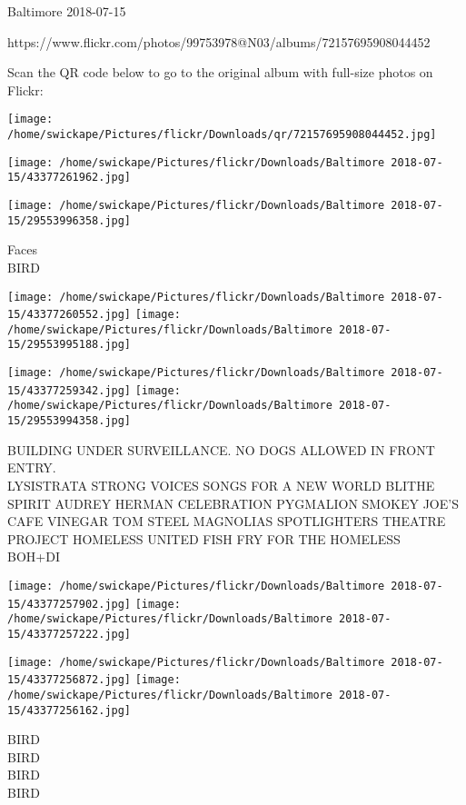 \documentclass[10pt,letterpaper]{article}
\begin{document}
Baltimore 2018-07-15

https://www.flickr.com/photos/99753978@N03/albums/72157695908044452

Scan the QR code below to go to the original album with full-size photos on Flickr:

\texttt{[image: /home/swickape/Pictures/flickr/Downloads/qr/72157695908044452.jpg]}
\pagebreak

\texttt{[image: /home/swickape/Pictures/flickr/Downloads/Baltimore 2018-07-15/43377261962.jpg]}

\vspace{0.25in}
\texttt{[image: /home/swickape/Pictures/flickr/Downloads/Baltimore 2018-07-15/29553996358.jpg]}

Faces\\
BIRD\\
\pagebreak

\texttt{[image: /home/swickape/Pictures/flickr/Downloads/Baltimore 2018-07-15/43377260552.jpg]}
\texttt{[image: /home/swickape/Pictures/flickr/Downloads/Baltimore 2018-07-15/29553995188.jpg]}

\texttt{[image: /home/swickape/Pictures/flickr/Downloads/Baltimore 2018-07-15/43377259342.jpg]}
\texttt{[image: /home/swickape/Pictures/flickr/Downloads/Baltimore 2018-07-15/29553994358.jpg]}

BUILDING UNDER SURVEILLANCE.  NO DOGS ALLOWED IN FRONT ENTRY.\\
LYSISTRATA STRONG VOICES SONGS FOR A NEW WORLD BLITHE SPIRIT AUDREY HERMAN CELEBRATION PYGMALION SMOKEY JOE'S CAFE VINEGAR TOM STEEL MAGNOLIAS SPOTLIGHTERS THEATRE\\
PROJECT HOMELESS UNITED FISH FRY FOR THE HOMELESS\\
BOH+DI\\
\pagebreak

\texttt{[image: /home/swickape/Pictures/flickr/Downloads/Baltimore 2018-07-15/43377257902.jpg]}
\texttt{[image: /home/swickape/Pictures/flickr/Downloads/Baltimore 2018-07-15/43377257222.jpg]}

\texttt{[image: /home/swickape/Pictures/flickr/Downloads/Baltimore 2018-07-15/43377256872.jpg]}
\texttt{[image: /home/swickape/Pictures/flickr/Downloads/Baltimore 2018-07-15/43377256162.jpg]}

BIRD\\
BIRD\\
BIRD\\
BIRD\\
\pagebreak
\end{document}
